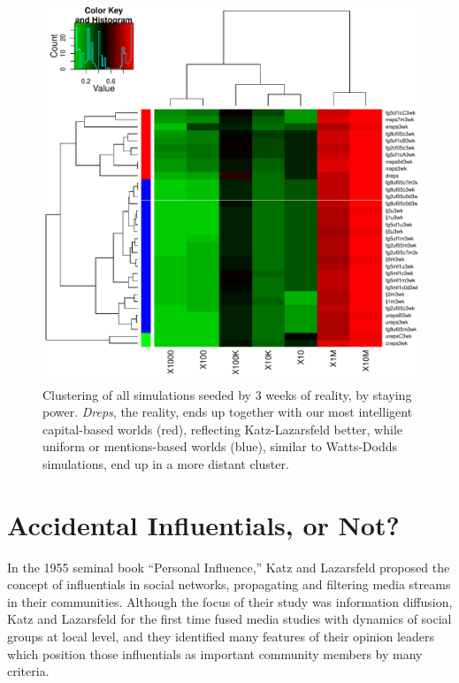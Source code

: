 \documentclass[10pt,oneside]{memoir}
\begin{document}
\begin{figure}
\begin{center}
    \includegraphics{figures/heatmap-srates-medians-3wk}
    \caption{Clustering of all simulations seeded by 3 weeks of reality, by staying power.  \emph{Dreps}, the reality, ends up together with our most intelligent capital-based worlds (red), reflecting Katz-Lazarsfeld better,  while uniform or mentions-based worlds (blue), similar to Watts-Dodds simulations, end up in a more distant cluster.}
    \label{figure:heatmap-srates-medians-3wk}
\end{center}
\end{figure}
\pagebreak \section{Accidental Influentials, or Not?}
\label{accidentalinfluentialsornot}

In the 1955 seminal book ``Personal Influence,'' Katz and Lazarsfeld proposed the concept of influentials in social networks, propagating and filtering media streams in their communities.  Although the focus of their study was information diffusion, Katz and Lazarsfeld for the first time fused media studies with dynamics of social groups at local level, and they identified many features of their opinion leaders which position those influentials as important community members by many criteria.
\end{document}
